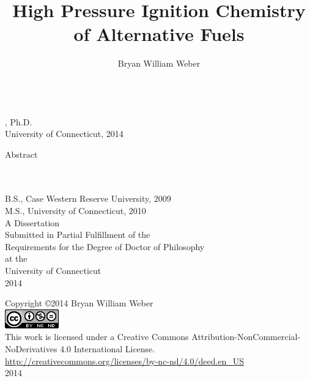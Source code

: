 \documentclass[12pt]{report}
\title{High Pressure Ignition Chemistry of Alternative Fuels}
\author{Bryan William Weber}
\newcommand{\blankline}{\vspace*{\baselineskip}}
\begin{document}
\thispagestyle{empty}
\begin{center}
\thetitle \\
\theauthor, Ph.D. \\
University of Connecticut, 2014 \\
\blankline
\end{center}
Abstract

\newpage

\thispagestyle{empty}
\begin{center}
\blankline \blankline 
\thetitle \\
\blankline
\theauthor \\
\blankline \blankline
B.S., Case Western Reserve University, 2009 \\
M.S., University of Connecticut, 2010 \\
\blankline \blankline \blankline \blankline \blankline \blankline
\blankline \blankline
A Dissertation \\
Submitted in Partial Fulfillment of the \\
Requirements for the Degree of Doctor of Philosophy \\
at the \\
University of Connecticut \\
\blankline \blankline
2014
\end{center}
\newpage

\thispagestyle{empty}
\begin{center}
Copyright \copyright 2014 Bryan William Weber \\
\includegraphics{images/CC-license.png} \\
\blankline
This work is licensed under a Creative Commons Attribution-NonCommercial-NoDerivatives 4.0 International License. \\
\url{http://creativecommons.org/licenses/by-nc-nd/4.0/deed.en_US} \\
\blankline \blankline \blankline \blankline \blankline \blankline
\blankline \blankline \blankline \blankline \blankline \blankline
\blankline \blankline \blankline \blankline \blankline \blankline
\blankline \blankline
2014
\end{center}
\newpage
\end{document}
